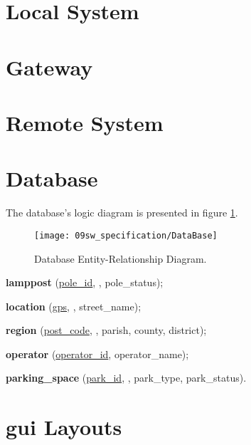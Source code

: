 \section{Local System}


\clearpage
\section{Gateway}


\clearpage
\section{Remote System}


\clearpage
\section{Database}
The database's logic diagram is presented in figure \ref{fig:database_er}.

\begin{figure}[H]
	\centering	
	\texttt{[image: 09sw\_specification/DataBase]}
	\caption{Database Entity-Relationship Diagram.}
	\label{fig:database_er}
\end{figure}


\textbf{lamppost} (\underline{pole\_id}, , pole\_status);

\textbf{location} (\underline{gps}, , street\_name);

\textbf{region} (\underline{post\_code}, , parish, county, district);

\textbf{operator} (\underline{operator\_id}, operator\_name);

\textbf{parking\_space} (\underline{park\_id}, , park\_type, park\_status).

\clearpage
\section{\ac{gui} Layouts}




